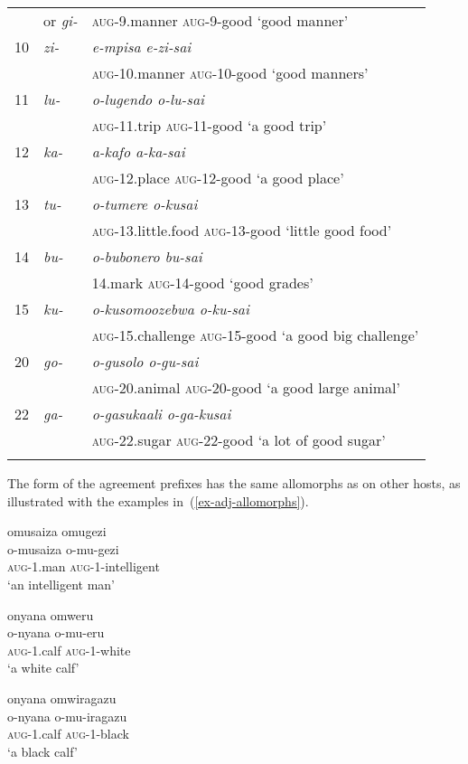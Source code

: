 \begin{table}[]
\begin{tabularx}{\textwidth}{XXl}
 & or \textit{gi-}&\textsc{aug}-9.manner \textsc{aug}-9-good ‘good manner’\\
10 & \textit{zi-} & \textit{e-mpisa e-zi-sai}\\
   & 			& \textsc{aug}-10.manner \textsc{aug}-10-good ‘good manners’\\
11 & \textit{lu-} & \textit{o-lugendo o-lu-sai}\\
   & 			& \textsc{aug}-11.trip \textsc{aug}-11-good ‘a good trip’\\
12 & \textit{ka-} & \textit{a-kafo a-ka-sai}\\
   & 			& \textsc{aug}-12.place \textsc{aug}-12-good ‘a good place’\\
13 & \textit{tu-} &\textit{o-tumere o-kusai}\\
		&& \textsc{aug}-13.little.food \textsc{aug}-13-good `little good food’\\
14 & \textit{bu-} & \textit{o-bubonero bu-sai}\\
   & 			&14.mark \textsc{aug}-14-good  `good grades’\\
15 & \textit{ku-} & \textit{o-kusomoozebwa o-ku-sai}\\
 &  & \textsc{aug}-15.challenge \textsc{aug}-15-good ‘a good big challenge’\\
20 & \textit{go-} & \textit{o-gusolo  o-gu-sai}\\
 &  & \textsc{aug}-20.animal \textsc{aug}-20-good ‘a good large animal’\\
22 & \textit{ga-} & \textit{o-gasukaali o-ga-kusai}\\
 &  & \textsc{aug}-22.sugar \textsc{aug}-22-good ‘a lot of good sugar’\\
\lspbottomrule
	\end{tabularx}
\end{table}

The form of the agreement prefixes has the same allomorphs as on other hosts, as illustrated with the examples in~(\ref{ex-adj-allomorphs}).

\ea \label{ex-adj-allomorphs}
\begin{xlist}
\ex 	\label{ex-adj-allomorphs1}
	\glll omusaiza	omugezi\\
	o-musaiza	o-mu-gezi\\
		\textsc{aug}-1.man	\textsc{aug}-1-intelligent\\
	\glt ‘an intelligent man’
	
\ex 	\label{ex-adj-allomorphs2}
	\glll onyana	omweru\\
	o-nyana	o-mu-eru\\
	\textsc{aug}-1.calf \textsc{aug}-1-white\\
	\glt ‘a white calf’

\ex 	\label{ex-adj-allomorphs3}
	\glll onyana	omwiragazu\\
    	o-nyana	o-mu-iragazu\\
		\textsc{aug}-1.calf	\textsc{aug}-1-black\\
\glt ‘a black calf’
\end{xlist}
\z

